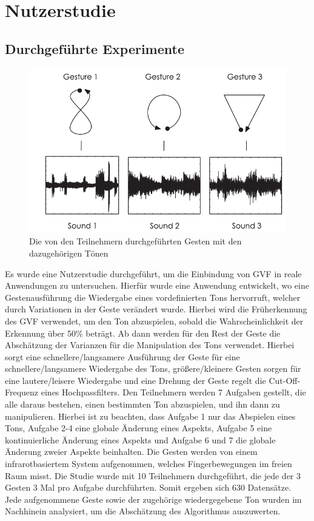 \documentclass{llncs}
\begin{document}
\section{Nutzerstudie}
\subsection{Durchgeführte Experimente}
\begin{figure}
\centering
\includegraphics[width=0.7\linewidth]{../Bilder/Fig10}
\caption{Die von den Teilnehmern durchgeführten Gesten mit den dazugehörigen Tönen}
\label{fig:Fig10}
\end{figure}
Es wurde eine Nutzerstudie durchgeführt, um die Einbindung von GVF in reale Anwendungen zu untersuchen. Hierfür wurde eine Anwendung entwickelt, wo eine Gestenausführung die Wiedergabe eines vordefinierten Tons hervorruft, welcher durch Variationen in der Geste verändert wurde. Hierbei wird die Früherkennung des GVF verwendet, um den Ton abzuspielen, sobald die Wahrscheinlichkeit der Erkennung über 50\% beträgt. Ab dann werden für den Rest der Geste die Abschätzung der Varianzen für die Manipulation des Tons verwendet. Hierbei sorgt eine schnellere/langsamere Ausführung der Geste für eine schnellere/langsamere Wiedergabe des Tons, größere/kleinere Gesten sorgen für eine lautere/leisere Wiedergabe und eine Drehung der Geste regelt die Cut-Off-Frequenz eines Hochpassfilters. Den Teilnehmern werden 7 Aufgaben gestellt, die alle daraus bestehen, einen bestimmten Ton abzuspielen, und ihn dann zu manipulieren. Hierbei ist zu beachten, dass Aufgabe 1 nur das Abspielen eines Tons, Aufgabe 2-4 eine globale Änderung eines Aspekts, Aufgabe 5 eine kontinuierliche Änderung eines Aspekts und Aufgabe 6 und 7 die globale Änderung zweier Aspekte beinhalten. Die Gesten werden von einem infrarotbasiertem System aufgenommen, welches Fingerbewegungen im freien Raum misst. Die Studie wurde mit 10 Teilnehmern durchgeführt, die jede der 3 Gesten 3 Mal pro Aufgabe durchführten. Somit ergeben sich 630 Datensätze. Jede aufgenommene Geste sowie der zugehörige wiedergegebene Ton wurden im Nachhinein analysiert, um die Abschätzung des Algorithmus auszuwerten.
\end{document}
